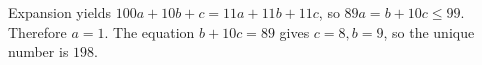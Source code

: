 Expansion yields $100a+10b+c=11a+11b+11c$, so $89a=b+10c\le99$. Therefore $a=1$. The equation $b+10c=89$ gives $c=8,b=9$, so the unique number is $\boxed{198}$.
